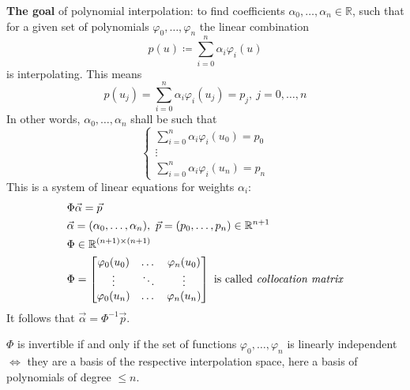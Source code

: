 \textbf{The goal} of polynomial interpolation: to find coefficients
$\alpha_0, \dots, \alpha_n \in \mathbb{R}$, such that for 
a given set of polynomials $\varphi_0, \dots, \varphi_n$
the linear combination
\[
    p(u) \coloneqq \sum_{i=0}^n \alpha_i \varphi_i(u)
\]
is interpolating. This means
\[
    p(u_j) = \sum_{i=0}^n \alpha_i \varphi_i(u_j) = p_j,\ j = 0, \dots, n
\]
In other words, $\alpha_0, \dots, \alpha_n$ shall be such that
\[
    \begin{cases}
        \sum_{i=0}^n \alpha_i \varphi_i(u_0) = p_0\\
        \vdots\\
        \sum_{i=0}^n \alpha_i \varphi_i(u_n) = p_n
    \end{cases}
\]
This is a system of linear equations for weights $\alpha_i$:
\begin{align*}
    &
    \Phi \vec{\alpha} = \vec{p}
    \\&
    \vec{\alpha} = (\alpha_0, \dots, \alpha_n),\
    \vec{p} = (p_0, \dots, p_n) \in \mathbb{R}^{n + 1}
    \\&
    \Phi \in \mathbb{R}^{(n + 1) \times (n + 1)}
    \\&
    \Phi = \begin{bmatrix}
        \varphi_0(u_0) & \dots & \varphi_n(u_0)\\
        \vdots & \ddots & \vdots\\
        \varphi_0(u_n) & \dots & \varphi_n(u_n)
    \end{bmatrix}
    \text{ is called \textit{collocation matrix}}
\end{align*}
It follows that $\vec{\alpha} = \Phi^{-1} \vec{p}$.

$\Phi$ is invertible if and only if the set of functions $\varphi_0, \dots, \varphi_n$
is linearly independent $\Longleftrightarrow$ they are a basis of the respective
interpolation space, here a basis of polynomials of degree $\le n$.
